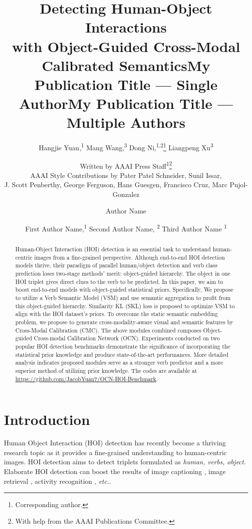 \documentclass[letterpaper]{article} \usepackage{aaai22}  \usepackage{times}  \usepackage{helvet}  \usepackage{courier}  \usepackage[hyphens]{url}  \usepackage{graphicx} \urlstyle{rm} \def\UrlFont{\rm}  \usepackage{natbib}  \usepackage{caption} \DeclareCaptionStyle{ruled}{labelfont=normalfont,labelsep=colon,strut=off} \frenchspacing  \setlength{\pdfpagewidth}{8.5in}  \setlength{\pdfpageheight}{11in}  \usepackage{algorithm}
\title{Detecting Human-Object Interactions \\ with Object-Guided Cross-Modal Calibrated Semantics}
\author{
    Hangjie Yuan,\textsuperscript{\rm 1}
    Mang Wang,\textsuperscript{\rm 3}
    Dong Ni,\textsuperscript{\rm 1,2}\thanks{Corresponding author.}
    Liangpeng Xu\textsuperscript{\rm 3}\\}
\author{
Written by AAAI Press Staff\textsuperscript{\rm 1}\thanks{With help from the AAAI Publications Committee.}\\
    AAAI Style Contributions by Pater Patel Schneider,
    Sunil Issar,\\
    J. Scott Penberthy,
    George Ferguson,
    Hans Guesgen,
    Francisco Cruz\equalcontrib,
    Marc Pujol-Gonzalez\equalcontrib
}
\title{My Publication Title --- Single Author}
\author {
    Author Name
}
\title{My Publication Title --- Multiple Authors}
\author {
First Author Name,\textsuperscript{\rm 1}
    Second Author Name, \textsuperscript{\rm 2}
    Third Author Name \textsuperscript{\rm 1}
}
\begin{document}
\maketitle

\begin{abstract}
Human-Object Interaction (HOI) detection is an essential task to understand human-centric images from a fine-grained perspective. Although end-to-end HOI detection models thrive, their paradigm of parallel human/object detection and verb class prediction loses two-stage methods' merit: object-guided hierarchy. The object in one HOI triplet gives direct clues to the verb to be predicted. In this paper, we aim to boost end-to-end models with object-guided statistical priors. Specifically, We propose to utilize a Verb Semantic Model (VSM) and use semantic aggregation to profit from this object-guided hierarchy. Similarity KL (SKL) loss is proposed to optimize VSM to align with the HOI dataset's priors. To overcome the static semantic embedding problem, we propose to generate cross-modality-aware visual and semantic features by Cross-Modal Calibration (CMC). The above modules combined composes Object-guided Cross-modal Calibration Network (OCN). Experiments conducted on two popular HOI detection benchmarks demonstrate the significance of incorporating the statistical prior knowledge and produce state-of-the-art performances. More detailed analysis indicates proposed modules serve as a stronger verb predictor and a more superior method of utilizing prior knowledge. The codes are available at \url{https://github.com/JacobYuan7/OCN-HOI-Benchmark}.
    




 
\end{abstract}



\section{Introduction}
Human Object Interaction (HOI) detection has recently become a thriving research topic as it provides a fine-grained understanding to human-centric images. HOI detection aims to detect triplets formulated as \textit{human, verbs, object}. Elaborate HOI detection can boost the results of image captioning \cite{yao2018exploringVR}, image retrieval \cite{johnson2015imageRt}, activity recognition \cite{yuan2021DIN}, \textit{etc.}.
\end{document}
